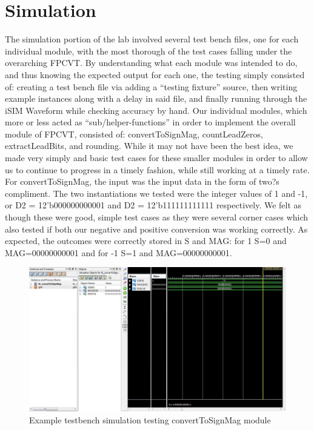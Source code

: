 \documentclass{article}
\begin{document}

\section*{Simulation}

	The simulation portion of the lab involved several test bench files, one for each individual module, with the most thorough of the test cases falling under the overarching FPCVT.  By understanding what each module was intended to do, and thus knowing the expected output for each one, the testing simply consisted of: creating a test bench file via adding a ``testing fixture'' source, then writing example instances along with a delay in said file, and finally running through the iSIM Waveform while checking accuracy by hand. Our individual modules, which more or less acted as ``sub/helper-functions'' in order to implement the overall module of FPCVT, consisted of: convertToSignMag, countLeadZeros, extractLeadBits, and rounding.  While it may not have been the best idea, we made very simply and basic test cases for these smaller modules in order to allow us to continue to progress in a timely fashion, while still working at a timely rate.  For convertToSignMag, the input was the input data in the form of two?s compliment.  The two instantiations we tested were the integer values of 1 and -1, or D2 = 12'b000000000001 and D2 = 12'b111111111111 respectively.  We felt as though these were good, simple test cases as they were several corner cases which also tested if both our negative and positive conversion was working correctly.  As expected, the outcomes were correctly stored in S and MAG: for 1 S=0 and MAG=00000000001 and for -1 S=1 and MAG=00000000001.     

\begin{figure}[H]
	\begin{center}
		\includegraphics[width=1\textwidth]{sim1.png} 
		\caption{Example testbench simulation testing convertToSignMag module}
	\end{center}
\end{figure}
\end{document}
